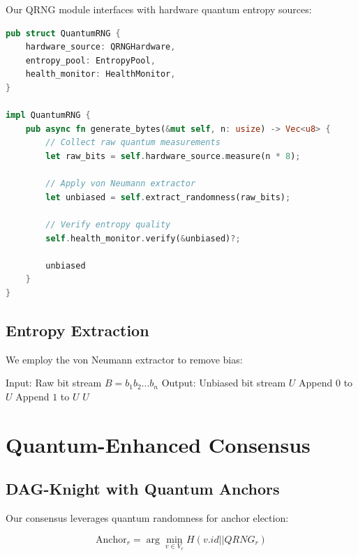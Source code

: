 \documentclass[11pt,a4paper]{article}
\begin{document}
Our QRNG module interfaces with hardware quantum entropy sources:

\begin{lstlisting}[language=Rust, caption=QRNG Integration]
pub struct QuantumRNG {
    hardware_source: QRNGHardware,
    entropy_pool: EntropyPool,
    health_monitor: HealthMonitor,
}

impl QuantumRNG {
    pub async fn generate_bytes(&mut self, n: usize) -> Vec<u8> {
        // Collect raw quantum measurements
        let raw_bits = self.hardware_source.measure(n * 8);
        
        // Apply von Neumann extractor
        let unbiased = self.extract_randomness(raw_bits);
        
        // Verify entropy quality
        self.health_monitor.verify(&unbiased)?;
        
        unbiased
    }
}
\end{lstlisting}

\subsection{Entropy Extraction}

We employ the von Neumann extractor to remove bias:

\begin{algorithm}
\caption{Von Neumann Entropy Extraction}
\begin{algorithmic}
\STATE Input: Raw bit stream $B = b_1b_2...b_n$
\STATE Output: Unbiased bit stream $U$
        \STATE Append $0$ to $U$
        \STATE Append $1$ to $U$
    \ENDIF
\ENDFOR
\RETURN $U$
\end{algorithmic}
\end{algorithm}

\section{Quantum-Enhanced Consensus}

\subsection{DAG-Knight with Quantum Anchors}

Our consensus leverages quantum randomness for anchor election:

\begin{equation}
\text{Anchor}_r = \arg\min_{v \in V_r} H(v.id || QRNG_r)
\end{equation}
\end{document}
